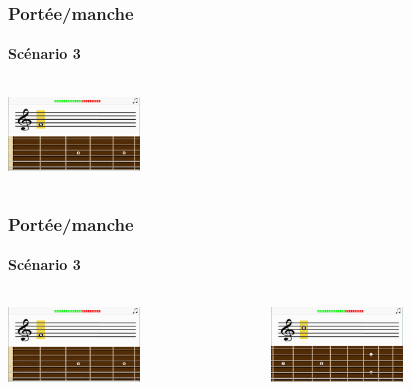 \documentclass{beamer}
\begin{document}
	\begin{frame}

   		\frametitle{Portée/manche}

       		\framesubtitle{Scénario 3}

		\begin{columns}

			 \begin{column}{0.4\textwidth}

				\includegraphics[width=3.5cm]{images/portee_question.png}

			\end{column}

			 \begin{column}{0.4\textwidth}

				
			\end{column}


		\end{columns} 

	\end{frame}

	\begin{frame}

   		\frametitle{Portée/manche}

       		\framesubtitle{Scénario 3}

		\begin{columns}

			 \begin{column}{0.4\textwidth}

				\includegraphics[width=3.5cm]{images/portee_question.png}

			\end{column}

			 \begin{column}{0.4\textwidth}

				\includegraphics[width=3.5cm]{images/portee_changement_manche.png}

				
			\end{column}


		\end{columns} 

	\end{frame}
\end{document}
